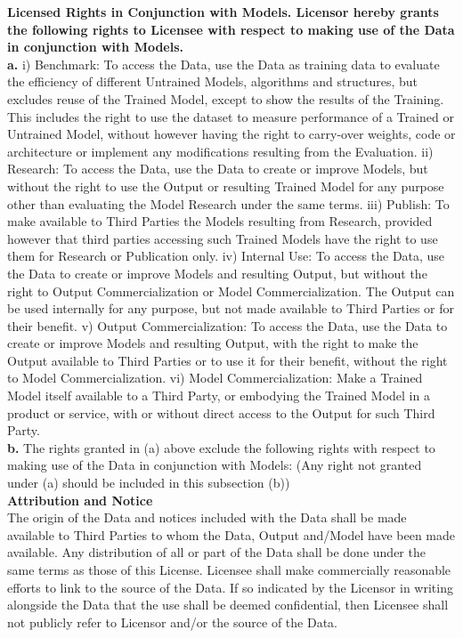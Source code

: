 \documentclass{article} %
\begin{document}
\newline
\textbf{Licensed Rights in Conjunction with Models. Licensor hereby grants the following rights to Licensee with respect to making use of the Data in conjunction with Models.}
\\
\newline
\textbf{a.}
\newline
i) Benchmark: To access the Data, use the Data as training data to evaluate the efficiency of different Untrained Models, algorithms and structures, but excludes reuse of the Trained Model, except to show the results of the Training. This includes the right to use the dataset to measure performance of a Trained or Untrained Model, without however having the right to carry-over weights, code or architecture or implement any modifications resulting from the Evaluation.
\newline
ii) Research: To access the Data, use the Data to create or improve Models, but without the right to use the Output or resulting Trained Model for any purpose other than evaluating the Model Research under the same terms. 
\newline
iii) Publish: To make available to Third Parties the Models resulting from Research, provided however that third parties accessing such Trained Models have the right to use them for Research or Publication only.
\newline
iv) Internal Use: To access the Data, use the Data to create or improve Models and resulting Output, but without the right to Output Commercialization or Model Commercialization. The Output can be used internally for any purpose, but not made available to Third Parties or for their benefit.
\newline
v) Output Commercialization: To access the Data, use the Data to create or improve Models and resulting Output, with the right to make the Output available to Third Parties or to use it for their benefit, without the right to Model Commercialization.
\newline
vi) Model Commercialization: Make a Trained Model itself available to a Third Party, or embodying the Trained Model in a product or service, with or without direct access to the Output for such Third Party.
\\
\newline
\textbf{b.} The rights granted in (a) above exclude the following rights with respect to making use of the Data in conjunction with Models:
(Any right not granted under (a) should be included in this subsection (b))
\\
\newline 
\textbf{Attribution and Notice}
\\
\newline
The origin of the Data and notices included with the Data shall be made available to Third Parties to whom the Data, Output and/Model have been made available. Any distribution of all or part of the Data shall be done under the same terms as those of this License. Licensee shall make commercially reasonable efforts to link to the source of the Data. If so indicated by the Licensor in writing alongside the Data that the use shall be deemed confidential, then Licensee shall not publicly refer to Licensor and/or the source of the Data. 
\end{document}
